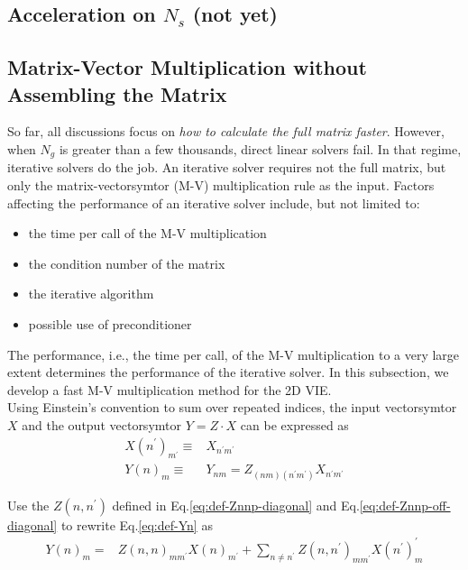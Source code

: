 \documentclass [10pt,letterpaper]{article}
\begin{document}
\subsection{Acceleration on $N_s$ (not yet)}
\label{sub:acceleration-on-Ns}






\subsection{Matrix-Vector Multiplication without Assembling the Matrix}
\label{sub:matrix-vectorsymtor-multiplication-without-assembling-the-matrix}

So far, all discussions focus on \emph{how to calculate the full matrix faster}.
However, when $N_g$ is greater than a few thousands, direct linear solvers fail. 
In that regime, iterative solvers do the job. 
An iterative solver requires not the full matrix, but only the matrix-vectorsymtor (M-V) multiplication rule as the input. 
Factors affecting the performance of an iterative solver include, but not limited to:
\begin{itemize}
	\item the time per call of the M-V multiplication
	\item the condition number of the matrix
	\item the iterative algorithm
	\item possible use of preconditioner
\end{itemize}

The performance, i.e., the time per call, of the M-V multiplication to a very large extent determines the performance of the iterative solver.  
In this subsection, we develop a fast M-V multiplication method for the 2D VIE.
\\

Using Einstein's convention to sum over repeated indices, the input vectorsymtor $X$ and the output vectorsymtor $Y=Z\cdot X$ can be expressed as
\begin{subequations} %
	\begin{align}
		X(n^\prime)_{m^\prime}
		\equiv
		&
		X_{n^\prime m^\prime}
		\label{eq:def-Xn}
		\\
		Y(n)_{m}
		\equiv
		&
		Y_{n m}
		=
		Z_{(n m)(n^\prime m^\prime)}
		X_{n^\prime m^\prime}
		\label{eq:def-Yn}
	\end{align}
\end{subequations}

Use the $Z(n,n^\prime)$ defined in Eq.\eqref{eq:def-Znnp-diagonal} and Eq.\eqref{eq:def-Znnp-off-diagonal} to rewrite Eq.\eqref{eq:def-Yn} as
\begin{equation} \label{eq:def-Yn-2}
	\begin{split}
		Y(n)_m
		=& 
		Z(n,n)_{m m^\prime}
		X(n)_{m^\prime}
		+
		\sum\nolimits_{n\neq n^\prime}
		Z(n,n^\prime)_{m m^\prime}
		X(n^\prime)_m^\prime
	\end{split}
\end{equation}
\end{document}

